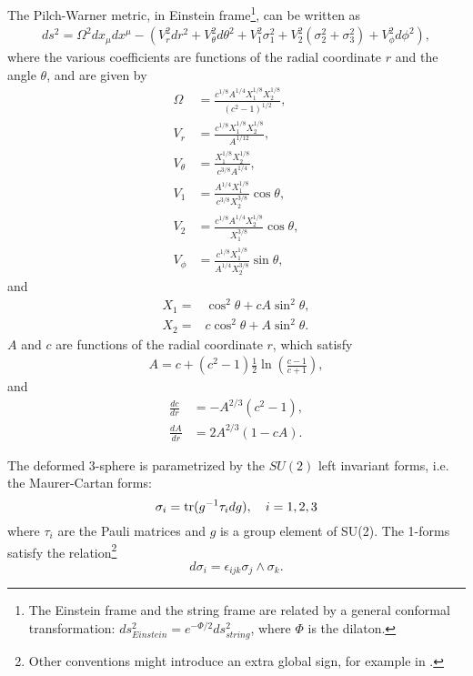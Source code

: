 The Pilch-Warner metric, in Einstein frame\footnote{The Einstein frame and the string frame are related by a general conformal transformation: $ds^2_{Einstein} = e^{-\Phi / 2} ds^2_{string}$, where $\Phi$ is the dilaton.}, can be written as \cite{Pilch:2003jg}
\begin{align}\label{eq:PWmetric}
ds^2 =
\Omega^2 dx_\mu dx^\mu -\left(
V_r^2 dr^2 + V_\theta^2 d\theta^2 + V_1^2 \sigma_1^2 + V_2^2 (\sigma_2^2 + \sigma_3^2) + V_\phi^2 d\phi^2\right),
\end{align}
where the various coefficients are functions of the radial coordinate $r$ and the angle $\theta$, and are given by
\begin{align}\label{eq:PWvielbeins}
\Omega &= \frac{c^{1/8} A^{1/4} X_1^{1/8} X_2^{1/8}}{(c^2 - 1)^{1/2}},\nonumber\\
V_r &= \frac{c^{1/8}X_1^{1/8} X_2^{1/8}}{A^{1/12}},\nonumber\\
V_\theta &= \frac{X_1^{1/8} X_2^{1/8}}{c^{3/8}A^{1/4}},\nonumber\\
V_1 &= \frac{A^{1/4}X_1^{1/8} }{c^{3/8}X_2^{3/8}} \cos\theta,\nonumber\\
V_2 &= \frac{c^{1/8}A^{1/4}X_2^{1/8} }{X_1^{3/8}} \cos\theta, \nonumber\\
V_\phi &= \frac{c^{1/8}X_1^{1/8} }{A^{1/4}X_2^{3/8}} \sin\theta,
\end{align}
and
\begin{align}
X_1 = & \cos^2\theta + cA  \sin^2\theta,\nonumber\\
X_2 = & c \cos^2\theta + A  \sin^2\theta.
\end{align}
$A$ and $c$ are functions of the radial coordinate $r$, which satisfy
\begin{align}
A = c+(c^2 -1)\frac{1}{2}\ln\left(\frac{c-1}{c+1}\right),
\end{align}
and
\begin{align}
\label{dcdr} \frac{dc}{dr} &= - A^{2/3}(c^2 - 1),\\ 
\label{dAdr} \frac{dA}{dr} &= 2 A^{2/3}\left(1 - c A\right).
\end{align}

The deformed 3-sphere is parametrized by the $SU(2)$ left invariant forms, i.e. the Maurer-Cartan forms:
\begin{equation}
\sigma_i = \mathop{\mathrm{tr}}(g^{-1}\tau_i d g), \quad i = 1,2,3
\end{equation}
where $\tau_i$ are the Pauli matrices and $g$ is a group element of SU(2). The 1-forms satisfy the relation\footnote{Other conventions might introduce an extra global sign, for example in \cite{Buchel:2000cn}.}
\begin{equation}
 d\sigma_i  = \epsilon_{i j k} \sigma_j \wedge \sigma_k.
\end{equation}



